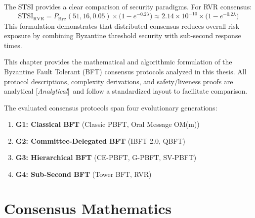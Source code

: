 \documentclass[12pt, oneside, a4paper]{report}
\theoremstyle{definition}
\theoremstyle{remark}
\newcommand{\analytical}{[\textit{Analytical}]}
\newcommand{\Pbyz}{P_{\mathrm{Byz}}}
\begin{document}
The STSI provides a clear comparison of security paradigms. For RVR consensus:
\begin{equation}
\mathrm{STSI}_{\mathrm{RVR}} = \Pbyz(51, 16, 0.05) \times \bigl(1 - e^{-0.2\lambda}\bigr) \approx 2.14 \times 10^{-10} \times \bigl(1 - e^{-0.2\lambda}\bigr)
\end{equation}
This formulation demonstrates that distributed consensus reduces overall risk exposure by combining Byzantine threshold security with sub-second response times.




This chapter provides the mathematical and algorithmic formulation of the Byzantine Fault Tolerant (BFT) consensus protocols analyzed in this thesis. All protocol descriptions, complexity derivations, and safety/liveness proofs are analytical \analytical\ and follow a standardized layout to facilitate comparison.

The evaluated consensus protocols span four evolutionary generations:
\begin{enumerate}
  \item \textbf{G1: Classical BFT} (Classic PBFT, Oral Message OM(m))
  \item \textbf{G2: Committee-Delegated BFT} (IBFT 2.0, QBFT)
  \item \textbf{G3: Hierarchical BFT} (CE-PBFT, G-PBFT, SV-PBFT)
  \item \textbf{G4: Sub-Second BFT} (Tower BFT, RVR)
\end{enumerate}

\bigskip

\chapter{Consensus Mathematics}
\label{ch:consensus_mathematics}
\end{document}
